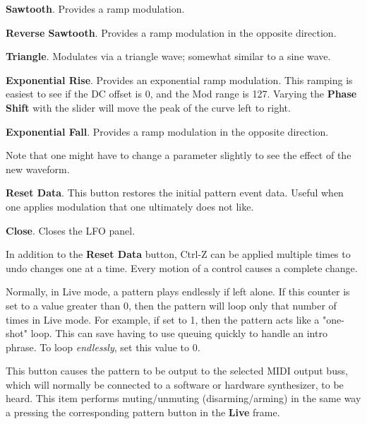 \begin{enumber}
\begin{enumber}
            \item \textbf{Sawtooth}.
               Provides a ramp modulation.
            \item \textbf{Reverse Sawtooth}.
               Provides a ramp modulation in the opposite direction.
            \item \textbf{Triangle}.
               Modulates via a triangle wave; somewhat similar to a sine wave.
            \item \textbf{Exponential Rise}.
               Provides an exponential ramp modulation.
               This ramping is easiest to see if the DC offset is 0,
               and the Mod range is 127.
               Varying the \textbf{Phase Shift} with the slider
               will move the peak of the curve left to right.
            \item \textbf{Exponential Fall}. Provides a ramp modulation in the
               opposite direction.
         \end{enumber}
         Note that one might have to change a parameter slightly to see the
         effect of the new waveform.
      \item \textbf{Reset Data}.
         This button restores the initial pattern event data.  Useful when one
         applies modulation that one ultimately does not like.
      \item \textbf{Close}.  Closes the LFO panel.
   \end{enumber}

   In addition to the \textbf{Reset Data} button, Ctrl-Z can be applied
   multiple times to undo changes one at a time.  Every motion of a control
   causes a complete change.

   Normally, in Live mode, a pattern plays endlessly if left alone.
   If this counter is set to a value greater than 0, then the pattern will loop
   only that number of times in Live mode.  For example, if set to 1, then the
   pattern acts like a "one-shot" loop.  This can save having to use
   queuing quickly to handle an intro phrase.
   To loop \textsl{endlessly}, set this value to 0.

   This button causes the pattern to be output to the
   selected MIDI output buss,
   which will normally be connected to a software or hardware
   synthesizer, to be heard.
   This item performs muting/unmuting (disarming/arming) in the same way a
   pressing the corresponding pattern button in the \textbf{Live} frame.

